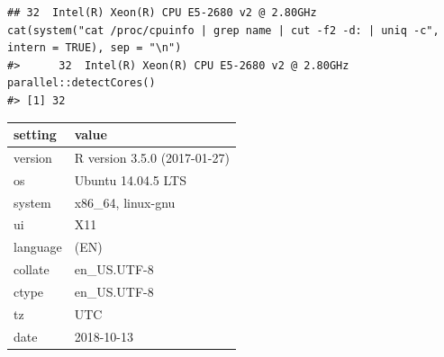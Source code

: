 \documentclass[12pt,a4paper,UTF8,twoside]{book}
\theoremstyle{definition}
\theoremstyle{definition}
\theoremstyle{definition}
\theoremstyle{remark}
\begin{document}
\begin{verbatim}
## 32  Intel(R) Xeon(R) CPU E5-2680 v2 @ 2.80GHz
cat(system("cat /proc/cpuinfo | grep name | cut -f2 -d: | uniq -c", intern = TRUE), sep = "\n")
#>      32  Intel(R) Xeon(R) CPU E5-2680 v2 @ 2.80GHz
parallel::detectCores()
#> [1] 32
\end{verbatim}

\begin{longtable}[]{@{}ll@{}}
\toprule
setting & value\tabularnewline
\midrule
\endhead
version & R version 3.5.0 (2017-01-27)\tabularnewline
os & Ubuntu 14.04.5 LTS\tabularnewline
system & x86\_64, linux-gnu\tabularnewline
ui & X11\tabularnewline
language & (EN)\tabularnewline
collate & en\_US.UTF-8\tabularnewline
ctype & en\_US.UTF-8\tabularnewline
tz & UTC\tabularnewline
date & 2018-10-13\tabularnewline
\bottomrule
\end{longtable}
\end{document}
